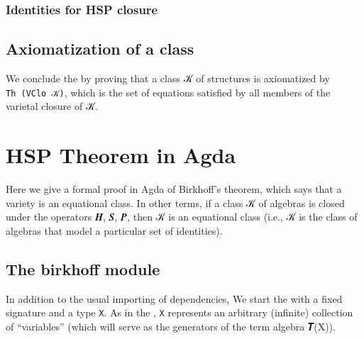 \documentclass[a4paper,USenglish,cleveref,autoref,thm-restate]{lipics-v2019}
\begin{document}
\subsubsection{Identities for HSP closure}\label{sec:identities-for-hsp-closure}
\begin{code}\end{code}


\subsection{Axiomatization of a class}\label{sec:axiomatization-of-a-class}
We conclude the \closuremodule by proving that a class 𝒦 of structures is axiomatized by \texttt{Th\ (VClo\ 𝒦)}, which is the set of equations satisfied by all members of the varietal closure of 𝒦.
\begin{code}\end{code}

\section{HSP Theorem in Agda}\label{sec:hsp-theorem-in-agda}
Here we give a formal proof in Agda of Birkhoff's theorem, which says that a variety is an equational class. In other terms, if a class 𝒦 of algebras is closed under the operators 𝑯, 𝑺, 𝑷, then 𝒦 is an equational class (i.e., 𝒦 is the class of algebras that model a particular set of identities).

\subsection{The birkhoff module}\label{sec:the-birkhoff-module}
In addition to the usual importing of dependencies, We start the \birkhoffmodule with a fixed signature and a type \texttt{X}. As in the \termsmodule, \texttt{X} represents an arbitrary (infinite) collection of ``variables'' (which will serve as the generators of the term algebra 𝑻(X)).
\begin{code}\end{code}
\end{document}
